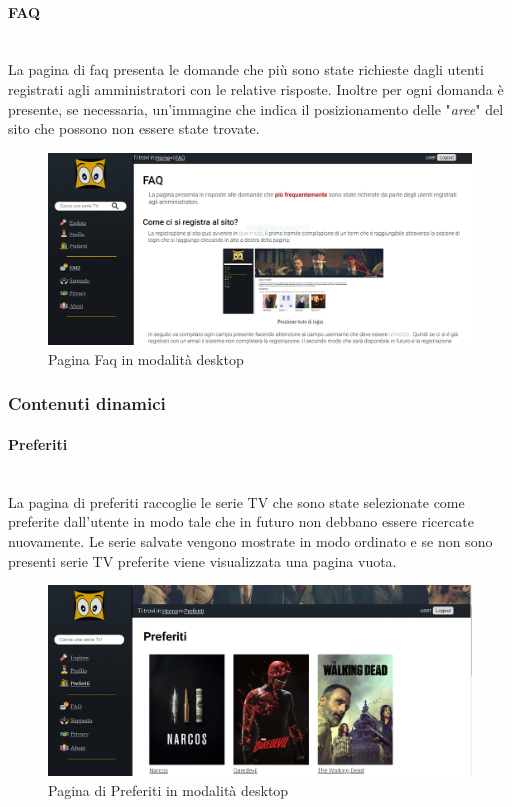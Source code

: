 \paragraph{FAQ} 
~\\
La pagina di faq presenta le domande che più sono state richieste dagli utenti registrati agli amministratori con le relative risposte. Inoltre per ogni domanda è presente, se necessaria, un'immagine che indica il posizionamento delle "\textit{aree}" del sito che possono non essere state trovate.
\begin{figure}[H]
	\centerline{\includegraphics[scale= 0.16]{img/faq.png}}
	\caption{Pagina Faq in modalità desktop}
	
\end{figure}
	

\subsubsection{Contenuti dinamici}   

\paragraph{Preferiti}
~\\	
La pagina di preferiti raccoglie le serie TV che sono state selezionate come preferite dall'utente in modo tale che in futuro non debbano essere ricercate nuovamente. Le serie salvate vengono mostrate in modo ordinato e se non sono presenti serie TV preferite viene visualizzata una pagina vuota. 
\begin{figure}[H]
	\centerline{\includegraphics[scale=0.23]{img/preferiti.png}}
	\caption{Pagina di Preferiti in modalità desktop}
	\label{fig:addForm}
\end{figure}	


